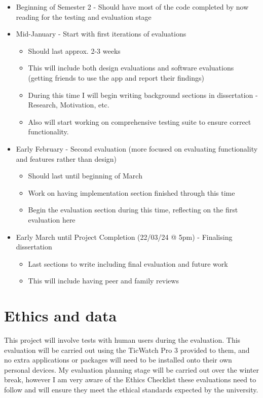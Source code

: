 \documentclass[11pt]{article}
\begin{document}
\begin{itemize}
    \item Beginning of Semester 2 - Should have most of the code completed by now reading for the testing and evaluation stage
    \item Mid-January - Start with first iterations of evaluations
    \begin{itemize}
        \item Should last approx. 2-3 weeks
        \item This will include both design evaluations and software evaluations (getting friends to use the app and report their findings)
        \item During this time I will begin writing background sections in dissertation - Research, Motivation, etc.
        \item Also will start working on comprehensive testing suite to ensure correct functionality.
    \end{itemize}
    \item Early February - Second evaluation (more focused on evaluating functionality and features rather than design)
    \begin{itemize}
        \item Should last until beginning of March
        \item Work on having implementation section finished through this time
        \item Begin the evaluation section during this time, reflecting on the first evaluation here
    \end{itemize}
    \item Early March until Project Completion (22/03/24 @ 5pm) - Finalising dissertation
    \begin{itemize}
        \item Last sections to write including final evaluation and future work
        \item This will include having peer and family reviews
    \end{itemize}
        
        
\end{itemize}

    
\section{Ethics and data}\label{ethics}

This project will involve tests with human users during the evaluation. This evaluation will be carried out using the TicWatch Pro 3 provided to them, and no extra applications or packages will need to be installed onto their own personal devices. My evaluation planning stage will be carried out over the winter break, however I am very aware of the Ethics Checklist these evaluations need to follow and will ensure they meet the ethical standards expected by the university.
\end{document}
